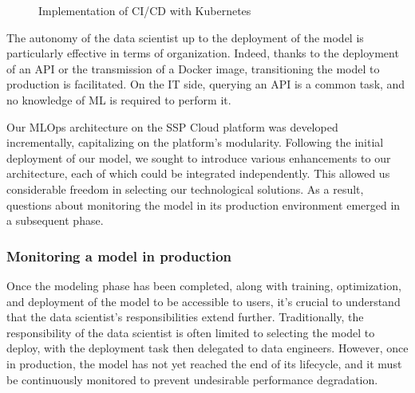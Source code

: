 \begin{figure}[htbp]
    \centering
    \caption{Implementation of CI/CD with Kubernetes}
    \label{fig:ci-cd}
\end{figure}

The autonomy of the data scientist up to the deployment of the model is particularly effective in terms of organization. Indeed, thanks to the deployment of an API or the transmission of a Docker image, transitioning the model to production is facilitated. On the IT side, querying an API is a common task, and no knowledge of ML is required to perform it.

Our MLOps architecture on the SSP Cloud platform was developed incrementally, capitalizing on the platform's modularity. Following the initial deployment of our model, we sought to introduce various enhancements to our architecture, each of which could be integrated independently. This allowed us considerable freedom in selecting our technological solutions. As a result, questions about monitoring the model in its production environment emerged in a subsequent phase.

\subsubsection{Monitoring a model in production}


Once the modeling phase has been completed, along with training, optimization, and deployment of the model to be accessible to users, it's crucial to understand that the data scientist's responsibilities extend further. Traditionally, the responsibility of the data scientist is often limited to selecting the model to deploy, with the deployment task then delegated to data engineers. However, once in production, the model has not yet reached the end of its lifecycle, and it must be continuously monitored to prevent undesirable performance degradation.

